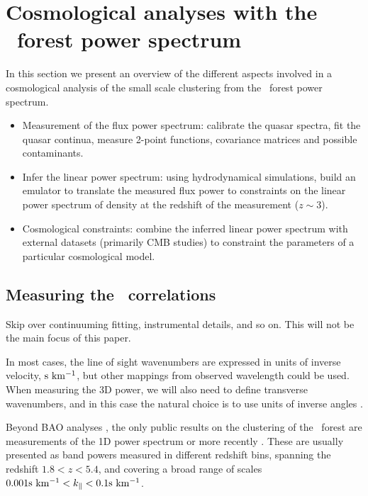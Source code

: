 \section{Cosmological analyses with the \lya\ forest power spectrum}
\label{sec:over}

In this section we present an overview of the different aspects involved in 
a cosmological analysis of the small scale clustering from the \lya\ forest
power spectrum.

\begin{itemize}
 \item Measurement of the flux power spectrum: calibrate the quasar spectra, 
  fit the quasar continua, measure 2-point functions, covariance matrices 
  and possible contaminants.
 \item Infer the linear power spectrum: using hydrodynamical simulations, 
  build an emulator to translate the measured flux power to constraints 
  on the linear power spectrum of density at the redshift of the measurement
  ($z \sim 3$).
 \item Cosmological constraints: combine the inferred linear power spectrum
  with external datasets (primarily CMB studies) to constraint the parameters
  of a particular cosmological model.
\end{itemize}

\subsection{Measuring the \lya\ correlations}

Skip over continuuming fitting, instrumental details, and so on.
This will not be the main focus of this paper.

In most cases, the line of sight wavenumbers are expressed in units of 
inverse velocity, ${\rm s~km^{-1}}$, but other mappings from observed wavelength 
could be used.
When measuring the 3D power, we will also need to define transverse 
wavenumbers, and in this case the natural choice is to use units of 
inverse angles \cite{Font-Ribera2018}.

Beyond BAO analyses \cite{Bautista2017,duMasdesBourboux2017}, the only 
public results on the clustering of the \lya\ forest are measurements of 
the 1D power spectrum \cite{Croft1998,McDonald2000,McDonald2006} or 
more recently \cite{Viel2013,Palanque-Delabrouille2013,Irsic2017,Walthers2018}.
These are usually presented as band powers measured in different redshift
bins, spanning the redshift $1.8 < z < 5.4$, and covering a broad range of 
scales $0.001 {\rm s~km^{-1}} < k_\parallel < 0.1 {\rm s~km^{-1}}$. 

